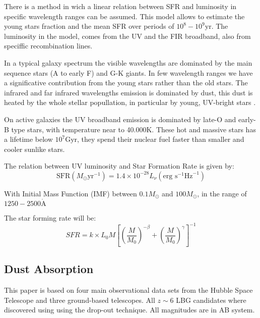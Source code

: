 \documentclass{emulateapj}
\begin{document}
There is a  method\citep{madau98} in wich a linear relation between SFR
and luminosity in specific wavelength ranges can be assumed. This model allows
to estimate the young stars fraction and the mean SFR over periods of $10^8 -
10^9 \textrm{yr}$\citep{kennicutt98}. The luminosity in the model, comes from
the UV and the FIR broadband, also from speciffic recombination lines.



In a typical galaxy spectrum the visible wavelengths are dominated by the main 
sequence stars (A to early F) and G-K giants. In few wavelength ranges we have 
a significative contribution from the young stars rather than the old stars. 
The infrared and far infrared wavelengths emission is dominated by dust, this 
dust is  heated by the whole stellar popullation, in particular by young, 
UV-bright stars \citep{law11}.

On active galaxies the UV broadband emission is dominated by late-O
and early-B type stars, with temperature near to 40.000K. These hot and massive
stars has a lifetime below $10^7\textrm{Gyr}$, they spend their nuclear fuel
faster than smaller and cooler sunlike stars.

The relation between UV luminosity and Star Formation Rate
\citep{madau98,kennicutt98} 
is given by:
\begin{equation}
 \textrm{SFR}\left(M_\odot \textrm{yr}^{-1}\right) 
      = 1.4 \times 10^{-28} L_{\nu} \left( \textrm{erg s}^{-1}\textrm{Hz}^{-1} 
	\right)
\end{equation}


  With Initial Mass Function (IMF) between $0.1 M_\odot$ 
 and $100 M_\odot$, in the range of $1250-2500 \mathring{\textrm{A}} $

The star forming rate will be:
  \begin{equation}
  SFR = k \times L_{0} M \left[ \left( \frac{M}{M_0}\right)^{-\beta} 
		   + \left( \frac{M}{M_0}\right)^{\gamma} 
               \right]^{-1}
  \end{equation}

\subsection{Dust Absorption}


This paper is based on four main observational data sets from the Hubble Space Telescope 
and three ground-based telescopes. All $z\sim 6$ LBG candidates where discovered using using 
the drop-out technique\citep{steidel03}. All magnitudes are in AB system.
\end{document}
